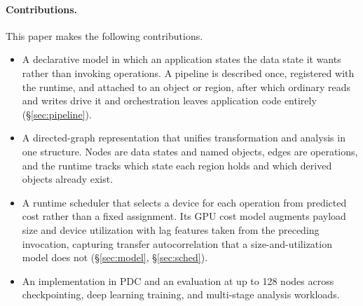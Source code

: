 \paragraph{Contributions.} This paper makes the following contributions.
\begin{itemize}
    \item A declarative model in which an application states the data state it wants rather than invoking operations. A pipeline is described once, registered with the runtime, and attached to an object or region, after which ordinary reads and writes drive it and orchestration leaves application code entirely (\S\ref{sec:pipeline}).

    \item A directed-graph representation that unifies transformation and analysis in one structure. Nodes are data states and named objects, edges are operations, and the runtime tracks which state each region holds and which derived objects already exist.

    \item A runtime scheduler that selects a device for each operation from predicted cost rather than a fixed assignment. Its GPU cost model augments payload size and device utilization with lag features taken from the preceding invocation, capturing transfer autocorrelation that a size-and-utilization model does not (\S\ref{sec:model}, \S\ref{sec:sched}).

    \item An implementation in PDC and an evaluation at up to 128 nodes across checkpointing, deep learning training, and multi-stage analysis workloads.
\end{itemize}
